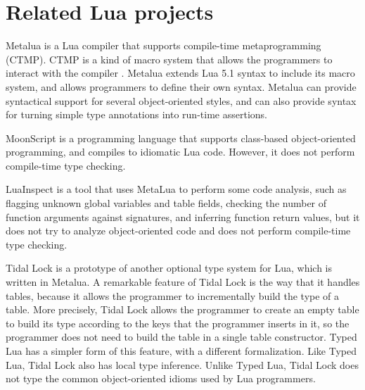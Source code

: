 \section{Related Lua projects}
\label{sec:related}

Metalua \citep{metalua} is a Lua compiler that supports compile-time
metaprogramming (CTMP).
CTMP is a kind of macro system that allows the programmers to interact
with the compiler \citep{fleutot2007contrasting}. 
Metalua extends Lua 5.1 syntax to include its macro system,
and allows programmers to define their own syntax.
Metalua can provide syntactical support for several object-oriented
styles, and can also provide syntax for turning simple type
annotations into run-time assertions.

MoonScript \citep{moonscript} is a programming language that supports
class-based object-oriented programming, and compiles to idiomatic
Lua code.
However, it does not perform compile-time type checking.

LuaInspect \citep{luainspect} is a tool that uses MetaLua to perform
some code analysis, such as flagging unknown global variables and
table fields, checking the number of function arguments against
signatures, and inferring function return values, but it does not
try to analyze object-oriented code and does not perform compile-time
type checking.

Tidal Lock \citep{tidallock} is a prototype of another optional type
system for Lua, which is written in Metalua.
A remarkable feature of Tidal Lock is the way that it handles tables,
because it allows the programmer to incrementally build the type of
a table.
More precisely, Tidal Lock allows the programmer to create an empty
table to build its type according to the keys that the programmer
inserts in it, so the programmer does not need to build the table in
a single table constructor.
Typed Lua has a simpler form of this feature, with a different
formalization.
Like Typed Lua, Tidal Lock also has local type inference.
Unlike Typed Lua, Tidal Lock does not type the common object-oriented
idioms used by Lua programmers.

